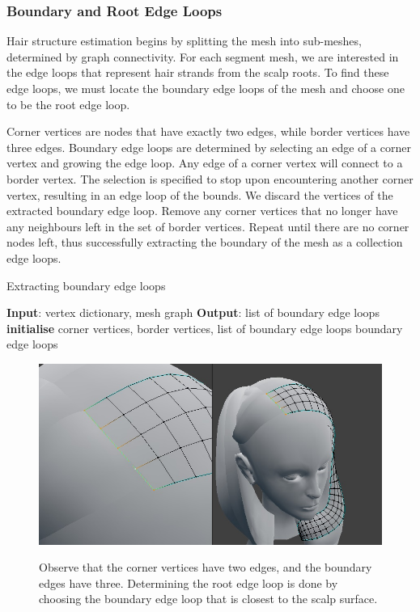 \documentclass[ %
author={Dillon Keith Diep},
supervisor={Dr. Carl Henrik Ek},
degree={MEng},
title={ART-CG:},
subtitle={Assisted Real-time Content Generation of 3D Hair by Learning Manifolds},
type={Research},
year={2017} ]{dissertation}
\begin{document}
\subsubsection{Boundary and Root Edge Loops}
Hair structure estimation begins by splitting the mesh into sub-meshes, determined by graph connectivity. For each segment mesh, we are interested in the edge loops that represent hair strands from the scalp roots. To find these edge loops, we must locate the boundary edge loops of the mesh and choose one to be the root edge loop.

Corner vertices are nodes that have exactly two edges, while border vertices have three edges. Boundary edge loops are determined by selecting an edge of a corner vertex and growing the edge loop. Any edge of a corner vertex will connect to a border vertex. The selection is specified to stop upon encountering another corner vertex, resulting in an edge loop of the bounds. We discard the vertices of the extracted boundary edge loop. Remove any corner vertices that no longer have any neighbours left in the set of border vertices. Repeat until there are no corner nodes left, thus successfully extracting the boundary of the mesh as a collection edge loops.

\begin{algorithm}[!h]
	\caption{Extracting boundary edge loops}
	\algrule
	\textbf{Input}: vertex dictionary, mesh graph\;
	\textbf{Output}: list of boundary edge loops\;
	\algrule
	\textbf{initialise} corner vertices, border vertices, list of boundary edge loops\;
	\Return boundary edge loops
\end{algorithm}

\begin{figure}[!h]
	\centering
	\caption{Observe that the corner vertices have two edges, and the boundary edges have three. Determining the root edge loop is done by choosing the boundary edge loop that is closest to the scalp surface.}
	\includegraphics[scale=0.5]{images/rootLoop}\\
\end{figure}
\end{document}
